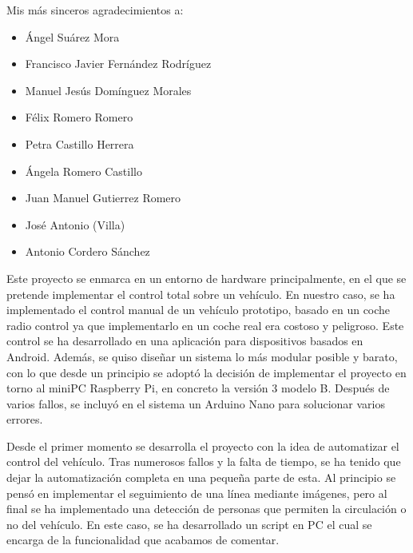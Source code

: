 \documentclass{pclass}
\begin{document}

\hacerportada

	
\frontmatter


Mis más sinceros agradecimientos a:

\begin{itemize}
	\item Ángel Suárez Mora
	\item Francisco Javier Fernández Rodríguez
	\item Manuel Jesús Domínguez Morales
	\item Félix Romero Romero
	\item Petra Castillo Herrera
	\item Ángela Romero Castillo
	\item Juan Manuel Gutierrez Romero
	\item José Antonio (Villa)
	\item Antonio Cordero Sánchez
	
\end{itemize}
 

Este proyecto se enmarca en un entorno de hardware principalmente, en el que se pretende implementar el control total sobre un vehículo. En nuestro caso, se ha implementado el control manual de un vehículo prototipo, basado en un coche radio control ya que implementarlo en un coche real era costoso y peligroso. Este control se ha desarrollado en una aplicación para dispositivos basados en Android. Además, se quiso diseñar un sistema lo más modular posible y barato, con lo que desde un principio se adoptó la decisión de implementar el proyecto en torno al miniPC Raspberry Pi, en concreto la versión 3 modelo B. Después de varios fallos, se incluyó en el sistema un Arduino Nano para solucionar varios errores.

\medspace
\medspace
\medspace

Desde el primer momento se desarrolla el proyecto con la idea de automatizar el control del vehículo. Tras numerosos fallos y la falta de tiempo, se ha tenido que dejar la automatización completa en una pequeña parte de esta. Al principio se pensó en implementar el seguimiento de una línea mediante imágenes, pero al final se ha implementado una detección de personas que permiten la circulación o no del vehículo. En este caso, se ha desarrollado un script en PC el cual se encarga de la funcionalidad que acabamos de comentar.
\end{document}
